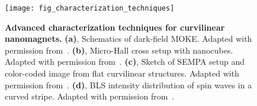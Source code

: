 %


\begin{figure}[t]
	\centering
	\texttt{[image: fig\_characterization\_techniques]}
	\caption{\label{fig:Characterization_techniques}%
		\textbf{Advanced characterization techniques for curvilinear nanomagnets.} \textbf{(a)}, Schematics of dark-field MOKE. Adapted with permission from~\cite{Sanz-Hernandez17}. \textbf{(b)}, Micro-Hall cross setup with nanocubes. Adapted with permission from~\cite{Mamoori18}. \textbf{(c)}, Sketch of SEMPA setup and color-coded image from flat curvilinear structures. Adapted with permission from~\cite{Schoenke20}. \textbf{(d)}, BLS intensity distribution of spin waves in a curved stripe. Adapted with permission from~\cite{Vogt12}.
	}
\end{figure}



